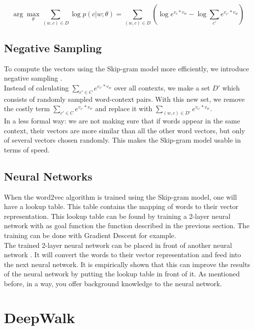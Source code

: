 \begin{equation} 
\arg \max_{\theta} \sum_{(w,c) \in D} \log p(c|w;\theta) = \sum_{(w,c) \in D} (\log e^{v_c * v_w} - \log \sum_{c'} e^{v_{c'}*v_w})
\end{equation}

\subsection{Negative Sampling}

To compute the vectors using the Skip-gram model more efficiently, we introduce negative sampling \cite{w2vExplained:article}. \\
Instead of calculating $\sum_{c' \in C}e^{v_{c'}*v_w}$ over all contexts, we make a set $D'$ which consists of randomly sampled word-context pairs. With this new set, we remove the costly term $\sum_{c' \in C}e^{v_{c'}*v_w}$ and replace it with $\sum_{(w,c) \in D'}e^{v_{c'}*v_w}$. \\

In a less formal way: we are not making sure that if words appear in the same context, their vectors are more similar than all the other word vectors, but only of several vectors chosen randomly. This makes the Skip-gram model usable in terms of speed.


\subsection{Neural Networks}

When the word2vec algorithm is trained using the Skip-gram model, one will have a lookup table. This table contains the mapping of words to their vector representation. This lookup table can be found by training a 2-layer neural network with as goal function the function described in the previous section. The training can be done with Gradient Descent for example. \\
The trained 2-layer neural network can be placed in front of another neural network \cite{w2vNN:online}. It will convert the words to their vector representation and feed into the next neural network. It is empirically shown that this can improve the results of the neural network by putting the lookup table in front of it. As mentioned before, in a way, you offer background knowledge to the neural network.

\section{DeepWalk}
\label{sec:deepwalk}

